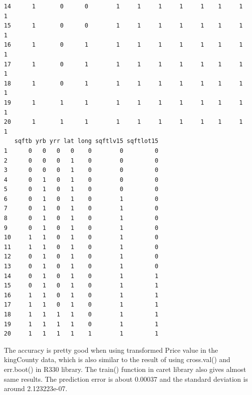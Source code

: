 \documentclass{article}%
\begin{document}
\begin{verbatim}
14      1       0      0        1     1     1     1     1    1     1     1
15      1       0      0        1     1     1     1     1    1     1     1
16      1       0      1        1     1     1     1     1    1     1     1
17      1       0      1        1     1     1     1     1    1     1     1
18      1       0      1        1     1     1     1     1    1     1     1
19      1       1      1        1     1     1     1     1    1     1     1
20      1       1      1        1     1     1     1     1    1     1     1
   sqftb yrb yrr lat long sqftlv15 sqftlot15
1      0   0   0   0    0        0         0
2      0   0   0   1    0        0         0
3      0   0   0   1    0        0         0
4      0   1   0   1    0        0         0
5      0   1   0   1    0        0         0
6      0   1   0   1    0        1         0
7      0   1   0   1    0        1         0
8      0   1   0   1    0        1         0
9      0   1   0   1    0        1         0
10     1   1   0   1    0        1         0
11     1   1   0   1    0        1         0
12     0   1   0   1    0        1         0
13     0   1   0   1    0        1         0
14     0   1   0   1    0        1         1
15     0   1   0   1    0        1         1
16     1   1   0   1    0        1         1
17     1   1   0   1    0        1         1
18     1   1   1   1    0        1         1
19     1   1   1   1    0        1         1
20     1   1   1   1    1        1         1
\end{verbatim}

The accuracy is pretty good when using transformed Price value in the kingCounty data, which is also similar to the result of using cross.val() and err.boot() in R330 library. The train() function in caret library also gives almost same results. The prediction error is about 0.00037 and the standard deviation is around 2.123223e-07.
\end{document}
